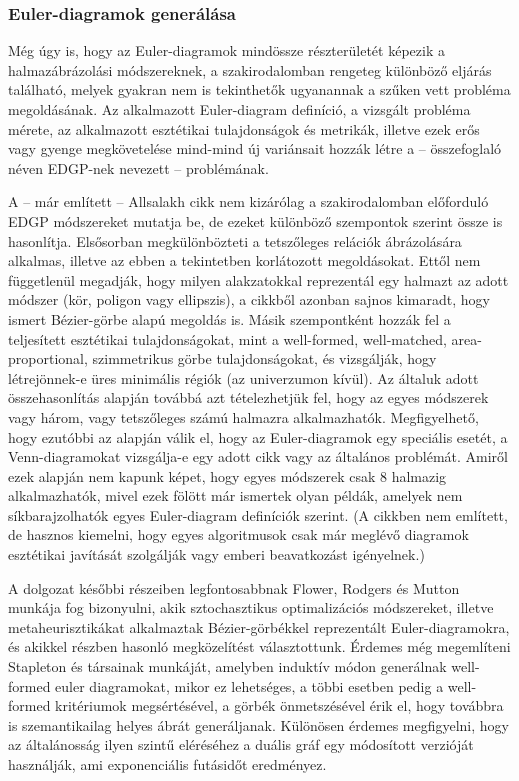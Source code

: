 \subsubsection{Euler-diagramok generálása}

Még úgy is, hogy az Euler-diagramok mindössze részterületét képezik a halmazábrázolási módszereknek, a szakirodalomban rengeteg különböző eljárás található, melyek gyakran nem is tekinthetők ugyanannak a szűken vett probléma megoldásának. Az alkalmazott Euler-diagram definíció, a vizsgált probléma mérete, az alkalmazott esztétikai tulajdonságok és metrikák, illetve ezek erős vagy gyenge megkövetelése mind-mind új variánsait hozzák létre a -- összefoglaló néven EDGP-nek nevezett -- problémának.

A -- már említett -- Allsalakh cikk\cite{alsallakah2016_the_state_of_the_art_set_visualization} nem kizárólag a szakirodalomban előforduló EDGP módszereket mutatja be, de ezeket különböző szempontok szerint össze is hasonlítja. Elsősorban megkülönbözteti a tetszőleges relációk ábrázolására alkalmas, illetve az ebben a tekintetben korlátozott megoldásokat. Ettől nem függetlenül megadják, hogy milyen alakzatokkal reprezentál egy halmazt az adott módszer (kör, poligon vagy ellipszis), a cikkből azonban sajnos kimaradt, hogy ismert Bézier-görbe alapú megoldás is\cite{layout_metrics}. Másik szempontként hozzák fel a teljesített esztétikai tulajdonságokat, mint a well-formed, well-matched, area-proportional, szimmetrikus görbe tulajdonságokat, és vizsgálják, hogy létrejönnek-e üres minimális régiók (az univerzumon kívül). Az általuk adott összehasonlítás alapján továbbá azt tételezhetjük fel, hogy az egyes módszerek vagy három, vagy tetszőleges számú halmazra alkalmazhatók. Megfigyelhető, hogy ezutóbbi az alapján válik el, hogy az Euler-diagramok egy speciális esetét, a Venn-diagramokat vizsgálja-e egy adott cikk vagy az általános problémát. Amiről ezek alapján nem kapunk képet, hogy egyes módszerek csak 8 halmazig alkalmazhatók\cite{drawability_8_sets}, mivel ezek fölött már ismertek olyan példák\cite{simonetto_undrawable, drawability_8_sets, inductive_euler}, amelyek nem síkbarajzolhatók egyes Euler-diagram definíciók szerint. (A cikkben nem említett, de hasznos kiemelni, hogy egyes algoritmusok csak már meglévő diagramok esztétikai javítását szolgálják\cite{euler_force} vagy emberi beavatkozást igényelnek\cite{sketch_euler}.)

A dolgozat későbbi részeiben legfontosabbnak Flower, Rodgers és Mutton munkája\cite{layout_metrics} fog bizonyulni, akik sztochasztikus optimalizációs módszereket, illetve metaheurisztikákat alkalmaztak Bézier-görbékkel reprezentált Euler-diagramokra, és akikkel részben hasonló megközelítést választottunk. Érdemes még megemlíteni Stapleton és társainak munkáját\cite{inductive_euler}, amelyben induktív módon generálnak well-formed euler diagramokat, mikor ez lehetséges, a többi esetben pedig a well-formed kritériumok megsértésével, a görbék önmetszésével érik el, hogy továbbra is szemantikailag helyes ábrát generáljanak. Különösen érdemes megfigyelni, hogy az általánosság ilyen szintű eléréséhez a duális gráf egy módosított verzióját használják, ami exponenciális futásidőt eredményez.


